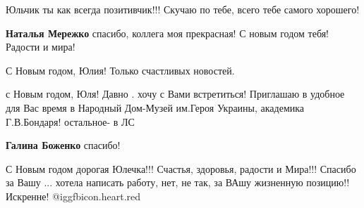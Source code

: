 \begin{itemize}
Юльчик ты как всегда позитивчик!!! Скучаю по тебе, всего тебе самого хорошего!

\begin{itemize} %
\textbf{Наталья Мережко} спасибо, коллега моя прекрасная! С новым годом тебя! Радости и мира!
\end{itemize} %

С Новым годом, Юлия!
Только счастливых новостей.


с Новым годом, Юля! Давно . хочу с Вами встретиться! Приглашаю в удобное для
Вас время в Народный Дом-Музей им.Героя Украины, академика Г.В.Бондаря!
остальное- в ЛС

\textbf{Галина Боженко} спасибо!


С Новым годом дорогая Юлечка!!! Счастья, здоровья, радости и Мира!!! Спасибо за
Вашу ... хотела написать работу, нет, не так, за ВАшу жизненную позицию!!
Искренне! @igg{fbicon.heart.red}

\end{itemize} %
